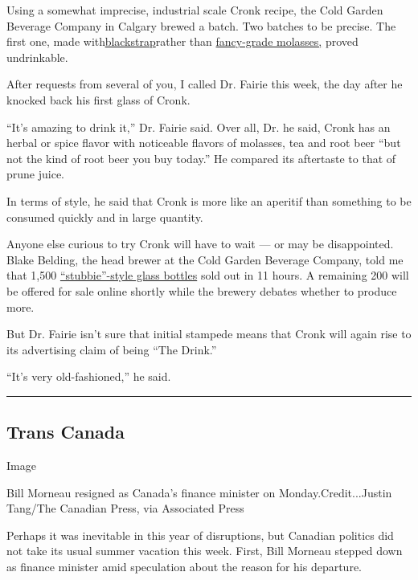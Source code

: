 Using a somewhat imprecise, industrial scale Cronk recipe, the Cold
Garden Beverage Company in Calgary brewed a batch. Two batches to be
precise. The first one, made
with\href{https://www.seriouseats.com/2017/02/what-is-blackstrap-molasses.html}{blackstrap}rather
than \href{https://www.crosbys.com/fancy-molasses/}{fancy-grade
molasses,} proved undrinkable.

After requests from several of you, I called Dr. Fairie this week, the
day after he knocked back his first glass of Cronk.

``It's amazing to drink it,'' Dr. Fairie said. Over all, Dr. he said,
Cronk has an herbal or spice flavor with noticeable flavors of molasses,
tea and root beer ``but not the kind of root beer you buy today.'' He
compared its aftertaste to that of prune juice.

In terms of style, he said that Cronk is more like an aperitif than
something to be consumed quickly and in large quantity.

Anyone else curious to try Cronk will have to wait --- or may be
disappointed. Blake Belding, the head brewer at the Cold Garden Beverage
Company, told me that 1,500
\href{https://www.canadianliving.com/food/entertaining/article/canadian-beer-bottles-do-you-know-your-history}{``stubbie''-style
glass bottles} sold out in 11 hours. A remaining 200 will be offered for
sale online shortly while the brewery debates whether to produce more.

But Dr. Fairie isn't sure that initial stampede means that Cronk will
again rise to its advertising claim of being ``The Drink.''

``It's very old-fashioned,'' he said.

\begin{center}\rule{0.5\linewidth}{\linethickness}\end{center}

\hypertarget{trans-canada}{%
\subsection{Trans Canada}\label{trans-canada}}

Image

Bill Morneau resigned as Canada's finance minister on
Monday.Credit...Justin Tang/The Canadian Press, via Associated Press

Perhaps it was inevitable in this year of disruptions, but Canadian
politics did not take its usual summer vacation this week. First, Bill
Morneau stepped down as finance minister amid speculation about the
reason for his departure.

